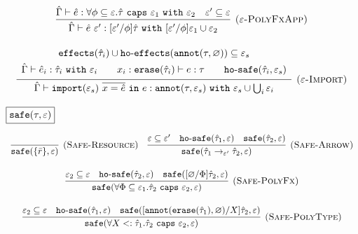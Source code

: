\documentclass{llncs}
\newcommand{\keywadj}[1]{\mathtt{#1}}
\newcommand{\keyw}[1]{\keywadj{#1}~}
\newcommand{\kw}[1]{\keyw{ #1 }}
\newcommand{\kwa}[1]{\keywadj{ #1 }}
\newcommand{\hyphen}{\hbox{-}}
\newcommand{\hofx}[1]{ \kwa{ho \hyphen effects}(#1) }
\newcommand{\safe}[2]{ \kwa{safe}(#1, #2) }
\newcommand{\hosafe}[2]{ \kwa{ho \hyphen safe}(#1, #2) }
\newcommand{\annot}[2]{
	\keywadj{annot}(#1, #2)
}
\newcommand{\erase}[1]{
	\keywadj{erase}(#1)
}
\newcommand{\polycap}[3]{
	\forall #1. #2~ \kw{caps} #3
}
\begin{document}
\[\begin{array}{c}
\infer[\textsc{($\varepsilon$-PolyFxApp)}]
	{ \hat \Gamma \vdash \hat e~\varepsilon' : [\varepsilon'/\phi]\hat \tau~\kw{with} [\varepsilon'/\phi]\varepsilon_1 \cup \varepsilon_2 }
	{ \hat \Gamma \vdash \hat e: \polycap{\phi \subseteq \varepsilon}{\hat \tau}{\varepsilon_1}~\kw{with} \varepsilon_2 & \varepsilon' \subseteq \varepsilon } \\[2ex]

\infer[\textsc{($\varepsilon$-Import)}]
	{ \hat \Gamma \vdash \kwa{import}(\varepsilon_s)~\overline{x = \hat e}~\kw{in} e: \kwa{annot}(\tau, \varepsilon_s)~\kw{with} \varepsilon_s \cup \bigcup_{i} \varepsilon_i }
{{\def\arraystretch{1.4}
  \begin{array}{c}
\kwa{effects}(\hat \tau_i) \cup \hofx{\annot{\tau}{\varnothing}}\subseteq \varepsilon_s \\
\hat \Gamma \vdash \hat e_i: \hat \tau_i~\kw{with} \varepsilon_i  ~~~~~~ x_i: \kwa{erase}(\hat \tau_i) \vdash e: \tau ~~~~~~ \hosafe{\hat \tau_i}{\varepsilon_s}
  \end{array}}} 
 
 
\end{array}
\]





\noindent
$\fbox{$\kwa{safe(\tau, \varepsilon)}$}$

\[
\begin{array}{c}

\infer[\textsc{(Safe-Resource)}]
	{\kwa{safe}(\{ \bar r \}, \varepsilon)}
	{}
~~~
\infer[\textsc{(Safe-Arrow)}]
	{\kwa{safe}(\hat \tau_1 \rightarrow_{\varepsilon'} \hat \tau_2, \varepsilon)}
	{\varepsilon \subseteq \varepsilon' & \kwa{ho \hyphen safe}(\hat \tau_1, \varepsilon) & \kwa{safe}(\hat \tau_2, \varepsilon)} \\[3ex]

\infer[\textsc{(Safe-PolyFx)}]
	{\safe{\forall \Phi \subseteq \varepsilon_1. \hat \tau_2~\kw{caps} \varepsilon_2}{\varepsilon} }
	{\varepsilon_2 \subseteq \varepsilon & \hosafe{\hat \tau_2}{\varepsilon} & \safe{[\varnothing/\Phi]\hat \tau_2}{\varepsilon}} \\[3ex]

\infer[\textsc{(Safe-PolyType)}]
	{\safe{\polycap{X <: \hat \tau_1}{\hat \tau_2}{\varepsilon_2}}{\varepsilon}}
	{\varepsilon_2 \subseteq \varepsilon & \hosafe{\hat \tau_1}{\varepsilon} & \safe{[\annot{\erase{\hat \tau_1}}{\varnothing}/X]\hat \tau_2}{\varepsilon}}

\end{array}
\]
\end{document}
